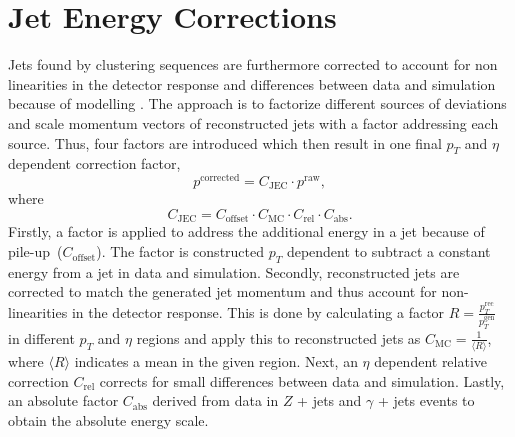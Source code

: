 \section{Jet Energy Corrections}
\label{sec:jec}
	Jets found by clustering sequences are furthermore corrected to account for non linearities in the detector response and differences between data and simulation because of modelling \cite{JEC}. The approach is to factorize different sources of deviations and scale momentum vectors of reconstructed jets with a factor addressing each source. Thus, four factors are introduced which then result in one final $p_T$ and $\eta$ dependent correction factor,
	\begin{equation}
	p^{\text{corrected}} = C_{\text{JEC}} \cdot p^{\text{raw}},
	\label{eq:jec}
	\end{equation}
	where
	\begin{equation}
	C_{\text{JEC}} = C_{\text{offset}} \cdot C_{\text{MC}} \cdot C_{\text{rel}} \cdot C_{\text{abs}}.
	\label{eq:cjec}
	\end{equation}
	Firstly, a factor is applied to address the additional energy in a jet because of pile-up~($C_{\text{offset}}$). The factor is constructed $p_T$ dependent to subtract a constant energy from a jet in data and simulation. Secondly, reconstructed jets are corrected to match the generated jet momentum and thus account for non-linearities in the detector response. This is done by calculating a factor $R=\frac{p_T^{\text{rec}}}{p_T^{\text{gen}}}$ in different $p_T$ and $\eta$ regions and apply this to reconstructed jets as $C_{\text{MC}} = \frac{1}{\langle R \rangle}$, where $\langle R \rangle$ indicates a mean in the given region. Next, an $\eta$ dependent relative correction $C_{\text{rel}}$ corrects for small differences between data and simulation. Lastly, an absolute factor $C_{\text{abs}}$ derived from data in $Z$ + jets and $\gamma$ + jets events to obtain the absolute energy scale.
	

